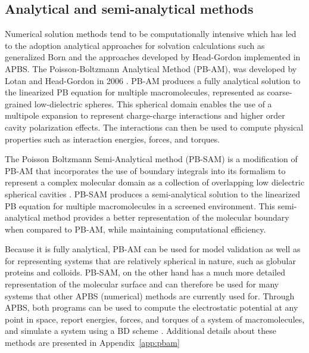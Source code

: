 \documentclass[11pt,titlepage]{article}
\begin{document}
\subsection{Analytical and semi-analytical methods} \label{sec:pbam}
Numerical solution methods tend to be computationally intensive which has led to the adoption analytical approaches for solvation calculations such as generalized Born \cite{Still} and the approaches developed by Head-Gordon implemented in APBS.
The Poisson-Boltzmann Analytical Method (PB-AM), was developed by Lotan and Head-Gordon in 2006 \cite{Lotan2006}.
PB-AM produces a fully analytical solution to the linearized PB equation for multiple macromolecules, represented as coarse-grained low-dielectric spheres.
This spherical domain enables the use of a multipole expansion to represent charge-charge interactions and higher order cavity polarization effects.
The interactions can then be used to compute physical properties such as interaction energies, forces, and torques.

The Poisson Boltzmann Semi-Analytical method (PB-SAM) is a modification of PB-AM that incorporates the use of boundary integrals into its formalism to represent a complex molecular domain as a collection of overlapping low dielectric spherical cavities \cite{Yap2010}.
PB-SAM produces a semi-analytical solution to the linearized PB equation for multiple macromolecules in a screened environment.
This semi-analytical method provides a better representation of the molecular boundary when compared to PB-AM, while maintaining computational efficiency.

Because it is fully analytical, PB-AM can be used for model validation as well as for representing systems that are relatively spherical in nature, such as globular proteins and colloids.
PB-SAM, on the other hand has a much more detailed representation of the molecular surface and can therefore be used for many systems that other APBS (numerical) methods are currently used for. Through APBS, both programs can be used to compute the electrostatic potential at any point in space, report energies, forces, and torques of a system of macromolecules, and simulate a system using a BD scheme \cite{Ermak1978}.
Additional details about these methods are presented in Appendix~\ref{app:pbam}
\end{document}
